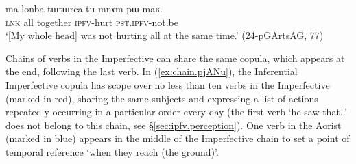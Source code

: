 \begin{exe}
\ex \label{ex:tumNAm.pWmaR}
\gll  ma lonba tɯtɯrca tu-mŋɤm pɯ-maʁ. \\
\textsc{lnk} all together \textsc{ipfv}-hurt \textsc{pst}.\textsc{ipfv}-not.be \\
\glt `[My whole head] was not hurting all at the same time.' (24-pGArtsAG, 77)
\end{exe}

Chains of verbs in the Imperfective can share the same copula, which appears at the end, following the last verb. In (\ref{ex:chain.pjANu}), the Inferential Imperfective copula  has scope over no less than ten verbs in the Imperfective (marked in red), sharing the same subjects and expressing a list of actions repeatedly occurring in a particular order every day (the first verb  `he saw that..' does not belong to this chain, see §\ref{sec:ipfv.perception}). One verb in the Aorist (marked in blue) appears in the middle of the Imperfective chain to set a point of temporal reference `when they reach (the ground)'.

